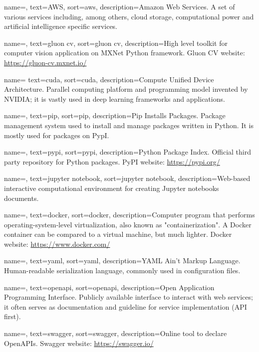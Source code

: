 {
	name=,
	text=AWS,
	sort=aws,
	description={Amazon Web Services. A set of various services including, among others, cloud storage, computational power and artificial intelligence specific services.}
}

{
	name=,
	text=gluon cv,
	sort=gluon cv,
	description={High level toolkit for computer vision application on MXNet Python framework. Gluon CV website: \url{https://gluon-cv.mxnet.io/}}
}

{
	name=
	text=cuda,
	sort=cuda,
	description={Compute Unified Device Architecture. Parallel computing platform and programming model invented by NVIDIA; it is vastly used in deep learning frameworks and applications.}
}

{
	name=,
	text=pip,
	sort=pip,
	description={Pip Installs Packages. Package management system used to install and manage packages written in Python. It is mostly used for packages on PypI.}
}

{
	name=,
	text=pypi,
	sort=pypi,
	description={Python Package Index. Official third party repository for Python packages. PyPI website: \url{https://pypi.org/}}
}

{
	name=,
	text=jupyter notebook,
	sort=jupyter notebook,
	description={Web-based interactive computational environment for creating Jupyter notebooks documents.}
}

{
	name=,
	text=docker,
	sort=docker,
	description={Computer program that performs operating-system-level virtualization, also known as "containerization". A Docker container can be compared to a virtual machine, but much lighter. Docker website: \url{https://www.docker.com/}}
}

{
	name=,
	text=yaml,
	sort=yaml,
	description={YAML Ain't Markup Language. Human-readable serialization language, commonly used in configuration files.}
}

{
	name=,
	text=openapi,
	sort=openapi,
	description={Open Application Programming Interface. Publicly available interface to interact with web services; it often serves as documentation and guideline for service implementation (API first).}
}

{
	name=,
	text=swagger,
	sort=swagger,
	description={Online tool to declare OpenAPIs. Swagger website: \url{https://swagger.io/}}
}

